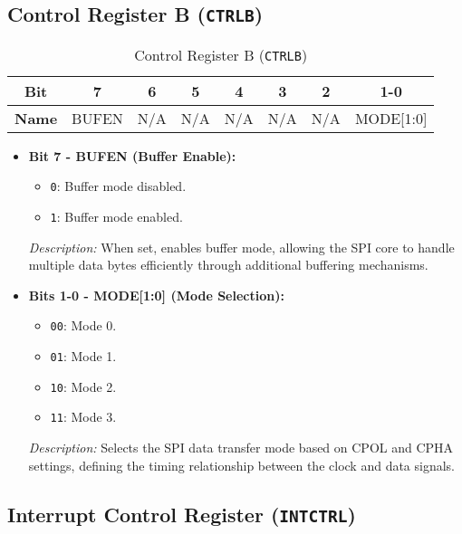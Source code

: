   \subsection{Control Register B (\texttt{CTRLB})}
  \label{sec:ctrlb}
  
  \begin{table}[H]
      \centering
      \caption{Control Register B (\texttt{CTRLB})}
      \begin{tabular}{@{}cccccccc@{}}
          \toprule
          \textbf{Bit} & 7 & 6 & 5 & 4 & 3 & 2 & 1-0 \\ \midrule
          \textbf{Name} & BUFEN & N/A & N/A & N/A & N/A & N/A & MODE[1:0] \\ \bottomrule
      \end{tabular}
      \label{tab:ctrl_b}
  \end{table}
  
  
  \begin{itemize}
      \item \textbf{Bit 7 - BUFEN (Buffer Enable):} 
      \begin{itemize}
          \item \texttt{0}: Buffer mode disabled.
          \item \texttt{1}: Buffer mode enabled.
      \end{itemize}
      \textit{Description:} When set, enables buffer mode, allowing the SPI core to handle multiple data bytes efficiently through additional buffering mechanisms.
      
      \item \textbf{Bits 1-0 - MODE[1:0] (Mode Selection):} 
      \begin{itemize}
          \item \texttt{00}: Mode 0.
          \item \texttt{01}: Mode 1.
          \item \texttt{10}: Mode 2.
          \item \texttt{11}: Mode 3.
      \end{itemize}
      \textit{Description:} Selects the SPI data transfer mode based on CPOL and CPHA settings, defining the timing relationship between the clock and data signals.
  \end{itemize}
  
  \subsection{Interrupt Control Register (\texttt{INTCTRL})}
  \label{sec:intctrl}
  
